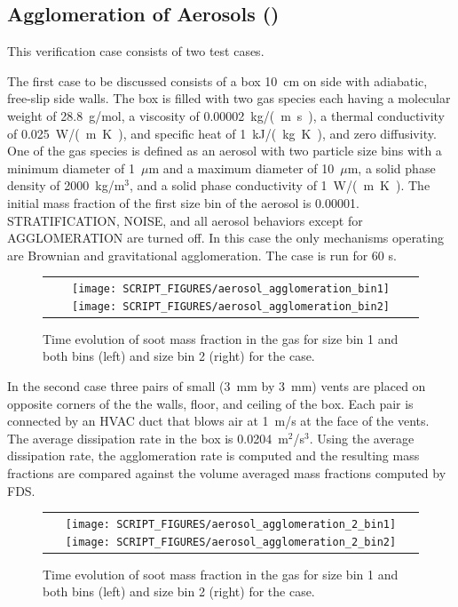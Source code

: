 \documentclass[11pt]{book}
\begin{document}
\subsection{Agglomeration of Aerosols (\texorpdfstring{}{aerosol\_agglomeration})}
    \label{aerosol_agglomeration}

This verification case consists of two test cases.

The first case to be discussed consists of a box 10~cm on side with adiabatic, free-slip side walls. The box is filled with two gas species each having a molecular weight of 28.8~g/mol, a viscosity of 0.00002~\si{kg/(m.s)}, a thermal conductivity of 0.025~\si{W/(m.K)}, and specific heat of 1~\si{kJ/(kg.K)}, and zero diffusivity. One of the gas species is defined as an aerosol with two particle size bins with a minimum diameter of 1~$\mu$m and a maximum diameter of 10~$\mu$m, a solid phase density of 2000~kg/m$^3$, and a solid phase conductivity of 1~\si{W/(m.K)}. The initial mass fraction of the first size bin of the aerosol is 0.00001. {\ct STRATIFICATION}, {\ct NOISE}, and all aerosol behaviors except for {\ct AGGLOMERATION} are turned off. In this case the only mechanisms operating are Brownian and gravitational agglomeration. The case is run for 60 s.

\begin{figure}[ht]
    \centering
    \begin{tabular}{c}
        \texttt{[image: SCRIPT\_FIGURES/aerosol\_agglomeration\_bin1]}
        \texttt{[image: SCRIPT\_FIGURES/aerosol\_agglomeration\_bin2]}
    \end{tabular}
    \caption[Gas phase soot mass fractions the  cases]{Time evolution of soot mass fraction in the gas for size bin 1 and both bins (left) and size bin 2 (right) for the  case.}
    \label{fig:agglomeration}
\end{figure}

In the second case three pairs of small (3~mm by 3~mm) vents are placed on opposite corners of the the walls, floor, and ceiling of the box. Each pair is connected by an HVAC duct that blows air at 1~m/s at the face of the vents. The average dissipation rate in the box is 0.0204~m$^2$/s$^3$. Using the average dissipation rate, the agglomeration rate is computed and the resulting mass fractions are compared against the volume averaged mass fractions computed by FDS.

\begin{figure}[ht]
    \centering
    \begin{tabular}{c}
        \texttt{[image: SCRIPT\_FIGURES/aerosol\_agglomeration\_2\_bin1]}
        \texttt{[image: SCRIPT\_FIGURES/aerosol\_agglomeration\_2\_bin2]}
    \end{tabular}
    \caption[Gas phase soot mass fractions the  cases]{Time evolution of soot mass fraction in the gas for size bin 1 and both bins (left) and size bin 2 (right) for the  case.}
    \label{fig:agglomeration_2}
\end{figure}
\end{document}
